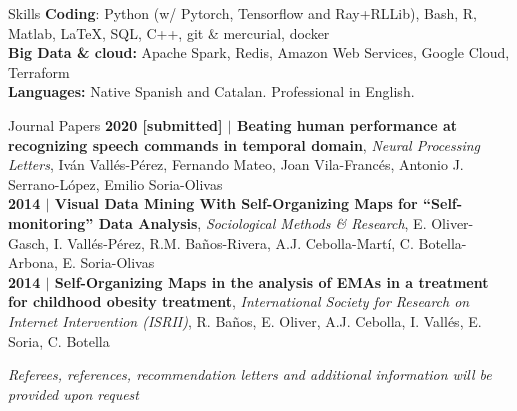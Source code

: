 \documentclass{resume} %
\begin{document}


\begin{rSection}{Skills} \itemsep -3pt
{\textbf{Coding}: Python (w/ Pytorch, Tensorflow and Ray+RLLib), Bash, R, Matlab, \LaTeX, SQL, C++, git \& mercurial, docker}  \\
{\textbf{Big Data \& cloud:} Apache Spark, Redis, Amazon Web Services, Google Cloud, Terraform} \\
{\textbf{Languages:} Native Spanish and Catalan. Professional in English.}
\end{rSection}



\begin{rSection}{Journal Papers}
{\textbf{{2020} [submitted] $|$ Beating human performance at recognizing speech commands in temporal domain}, \textit{Neural Processing Letters}, Iván Vallés-Pérez, Fernando Mateo, Joan Vila-Francés, Antonio J. Serrano-López, Emilio Soria-Olivas}\\
{\textbf{{2014} $|$ Visual Data Mining With Self-Organizing Maps for ``Self-monitoring'' Data Analysis}, \textit{Sociological Methods \& Research}, E. Oliver-Gasch, I. Vallés-Pérez, R.M. Baños-Rivera, A.J. Cebolla-Martí, C. Botella-Arbona, E. Soria-Olivas}\\
{\textbf{{2014} $|$ Self-Organizing Maps in the analysis of EMAs in a treatment for childhood obesity treatment}, \textit{International Society for Research on Internet Intervention (ISRII)}, R. Baños, E. Oliver, A.J. Cebolla, I. Vallés, E. Soria, C. Botella}

\end{rSection}

\vspace{\fill}
\begin{flushright}
	\small{\textit{Referees, references, recommendation letters and additional information will be provided upon request}}
\end{flushright}
\end{document}
